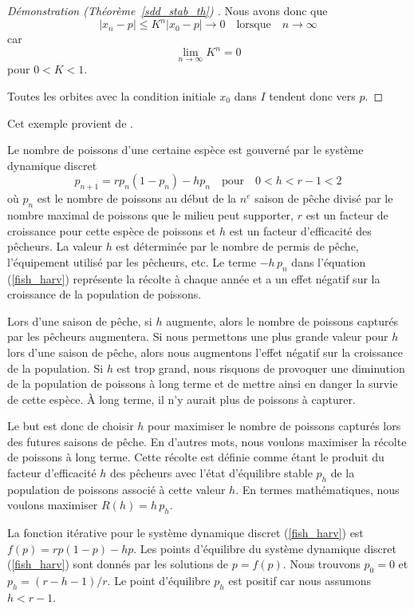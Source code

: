 {\begin{proof}[Démonstration (Théorème~\ref{sdd_stab_th}) \theory]
 Nous avons donc que
\[
|x_n -p| \leq K^n |x_0-p|  \to 0 \quad \text{lorsque} \quad n \to \infty
\]
car
\[
\lim_{n\rightarrow \infty} K^n = 0
\]
pour $0<K<1$.

Toutes les orbites avec la condition initiale $x_0$ dans $I$
tendent donc vers $p$.
\end{proof}

\begin{egg}
Cet exemple provient de \cite{A}.

Le nombre de poissons d'une certaine espèce est gouverné par le
système dynamique discret
\begin{equation}\label{fish_harv}
p_{n+1} = r p_n (1-p_n) - h p_n  \quad \text{pour} \quad  0 < h < r
-1 < 2 
\end{equation}
où $p_n$ est le nombre de poissons au début de la $n^e$ saison de
pêche divisé par le nombre maximal de poissons que le milieu peut
supporter, $r$ est un facteur de croissance pour cette espèce de
poissons et $h$ est un facteur d'efficacité des pêcheurs. La valeur
$h$ est déterminée par le nombre de permis de pêche, l'équipement
utilisé par les pêcheurs, etc.  Le terme $-h\,p_n$ dans l'équation
(\ref{fish_harv}) représente la récolte à chaque année et a un effet
négatif sur la croissance de la population de poissons.

Lors d'une saison de pêche, si $h$ augmente, alors le nombre de
poissons capturés par les pêcheurs augmentera.  Si nous permettons une plus
grande valeur pour $h$ lors d'une saison de pêche, alors nous augmentons
l'effet négatif sur la croissance de la population.  Si $h$ est trop
grand, nous risquons de provoquer une diminution de la population de
poissons à long terme et de mettre ainsi en danger la survie de
cette espèce.  À long terme, il n'y aurait plus de poissons à capturer.

Le but est donc de choisir $h$ pour maximiser le nombre de poissons
capturés lors des futures saisons de pêche.  En d'autres mots, nous
voulons maximiser la récolte de poissons à long terme.  Cette récolte est
définie comme étant le produit du facteur d'efficacité $h$ des
pêcheurs avec l'état d'équilibre stable $p_h$ de la population de
poissons associé à cette valeur $h$.  En termes mathématiques, nous
voulons maximiser $R(h) = h\,p_h$.

La fonction itérative pour le système dynamique discret
(\ref{fish_harv}) est $f(p) = r p(1-p) - h p$.  Les points d'équilibre
du système dynamique discret (\ref{fish_harv}) sont donnés par les
solutions de $p = f(p)$.  Nous trouvons $p_0 = 0$ et $p_h = (r-h-1)/r$.  Le
point d'équilibre $p_h$ est positif car nous assumons $h < r-1$.


\end{egg}}
